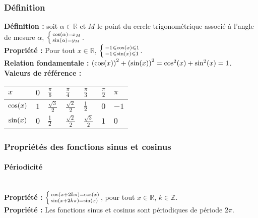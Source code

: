 \documentclass[a4paper,titlepage]{article}
\let\oldleft\left
\renewcommand{\left}{\mathopen{}\mathclose\bgroup\oldleft}
\let\oldright\right
\renewcommand{\right}{\aftergroup\egroup\oldright}
\begin{document}
        \subsubsection{Définition}
            \textbf{Définition :} soit $\alpha\in\mathbb{R}$ et $M$ le point du cercle trigonométrique associé à l’angle de mesure $\alpha$, $\left\{\begin{smallmatrix*}[l]\cos\left(\alpha\right)=x_{M}\\\sin\left(\alpha\right)=y_{M}\end{smallmatrix*}\!\right.$.
            \\
            \textbf{Propriété :} Pour tout $x\in\mathbb{R}$, $\left\{\begin{smallmatrix*}[l]-1\leqslant\cos\left(x\right)\leqslant1\\-1\leqslant\sin\left(x\right)\leqslant1\end{smallmatrix*}\!\right.$.
            \\
            \textbf{Relation fondamentale :} $\left(\cos\left(x\right)\right)^{2}+\left(\sin\left(x\right)\right)^{2}=\cos^{2}\left(x\right)+\sin^{2}\left(x\right)=1$.
            \\
            \textbf{Valeurs de référence :}
            \\
            \begin{tabularx}{\linewidth}{|Y|Y|Y|Y|Y|Y|Y|}
                \hline
                $x$&$0$&$\frac{\pi}{6}$&$\frac{\pi}{4}$&$\frac{\pi}{3}$&$\frac{\pi}{2}$&$\pi$\\
                \hline
                $\cos\left(x\right)$&$1$&$\frac{\sqrt{3}}{2}$&$\frac{\sqrt{2}}{2}$&$\frac{1}{2}$&$0$&$-1$\\
                \hline
                $\sin\left(x\right)$&$0$&$\frac{1}{2}$&$\frac{\sqrt{2}}{2}$&$\frac{\sqrt{3}}{2}$&$1$&$0$\\
                \hline
            \end{tabularx}
        \subsubsection{Propriétés des fonctions sinus et cosinus}
            \paragraph{Périodicité}\mbox{}\\
                \textbf{Propriété :} $\left\{\begin{smallmatrix*}[l]\cos\left(x+2k\pi\right)=\cos\left(x\right)\\\sin\left(x+2k\pi\right)=\sin\left(x\right)\end{smallmatrix*}\!\right.$, pour tout $x\in\mathbb{R}$, $k\in\mathbb{Z}$.
                \\
                \textbf{Propriété :} Les fonctions sinus et cosinus sont périodiques de période $2\pi$.
\end{document}
